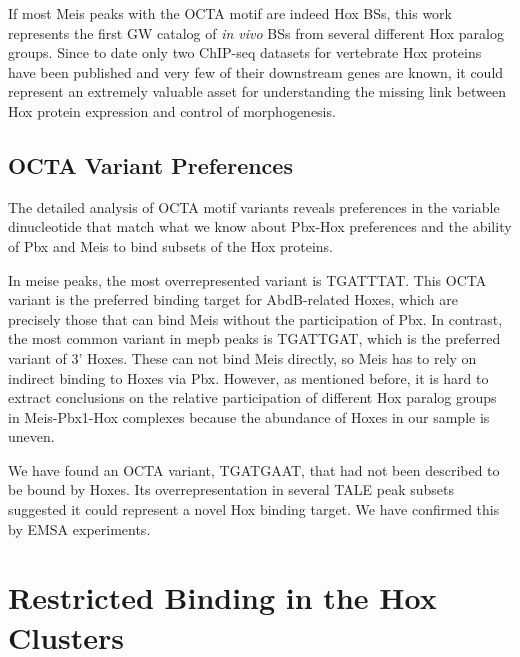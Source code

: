 
If most Meis peaks with the \ac{OCTA} motif are indeed Hox \acp{BS}, this work represents the first \ac{GW} catalog of \textit{in vivo} \acp{BS} from several different Hox paralog groups. Since to date only two ChIP-seq datasets for vertebrate Hox proteins have been published \parencite{Jung2010, Donaldson2012} and very few of their downstream genes are known, it could represent an extremely valuable asset for understanding the missing link between Hox protein expression and control of morphogenesis. %

\subsection{OCTA Variant Preferences}

The detailed analysis of \ac{OCTA} motif variants reveals preferences in the variable dinucleotide that match what we know about Pbx-Hox preferences and the ability of Pbx and Meis to bind subsets of the Hox proteins. 

In \ac{meise} peaks, the most overrepresented variant is TGATTTAT. This \ac{OCTA} variant is the preferred binding target for AbdB-related Hoxes, which are precisely those that can bind Meis without the participation of Pbx. In contrast, the most common variant in \ac{mepb} peaks is TGATTGAT, which is the preferred variant of 3' Hoxes. These can not bind Meis directly, so Meis has to rely on indirect binding to Hoxes via Pbx. However, as mentioned before, it is hard to extract conclusions on the relative participation of different Hox paralog groups in Meis-Pbx1-Hox complexes because the abundance of Hoxes in our sample is uneven. %

We have found an \ac{OCTA} variant, TGATGAAT, that had not been described to be bound by Hoxes. Its overrepresentation in several \ac{TALE} peak subsets suggested it could represent a novel Hox binding target. We have confirmed this by \ac{EMSA} experiments. 

\section{Restricted Binding in the Hox Clusters}

